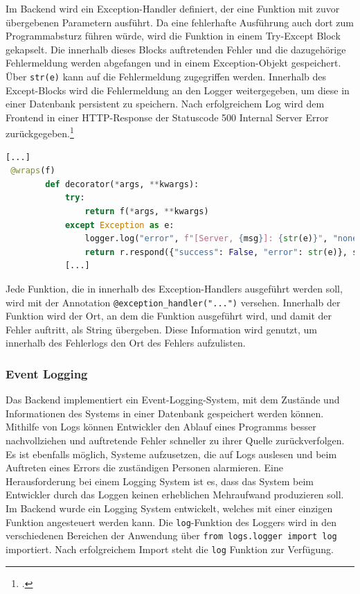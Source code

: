 Im Backend wird ein Exception-Handler definiert, der eine Funktion mit zuvor übergebenen Parametern ausführt. Da eine fehlerhafte Ausführung auch dort zum Programmabsturz führen würde, wird die Funktion in einem Try-Except Block gekapselt. Die innerhalb dieses Blocks auftretenden Fehler und die dazugehörige Fehlermeldung werden abgefangen und in einem Exception-Objekt gespeichert. Über \texttt{str(e)} kann auf die Fehlermeldung zugegriffen werden. Innerhalb des Except-Blocks wird die Fehlermeldung an den Logger weitergegeben, um diese in einer Datenbank persistent zu speichern. Nach erfolgreichem Log wird dem Frontend in einer HTTP-Response der Statuscode 500 \glqq Internal Server Error\grqq{} zurückgegeben.\footcite{fielding1999rfc2616}

\begin{lstlisting}[language=Python, caption={Exception-Handling mithilfe von Wrappern}]
[...]
 @wraps(f)
        def decorator(*args, **kwargs):
            try:
                return f(*args, **kwargs)
            except Exception as e:
                logger.log("error", f"[Server, {msg}]: {str(e)}", "none")
                return r.respond({"success": False, "error": str(e)}, status=500)
            [...]
\end{lstlisting}

Jede Funktion, die in innerhalb des Exception-Handlers ausgeführt werden soll, wird mit der Annotation \texttt{@exception\_{}handler("...")} versehen. Innerhalb der Funktion wird der Ort, an dem die Funktion ausgeführt wird, und damit der Fehler auftritt, als String übergeben. Diese Information wird genutzt, um innerhalb des Fehlerlogs den Ort des Fehlers aufzulisten.

\subsubsection{Event Logging}
Das Backend implementiert ein Event-Logging-System, mit dem Zustände und Informationen des Systems in einer Datenbank gespeichert werden können. Mithilfe von Logs können Entwickler den Ablauf eines Programms besser nachvollziehen und auftretende Fehler schneller zu ihrer Quelle zurückverfolgen. Es ist ebenfalls möglich, Systeme aufzusetzen, die auf Logs auslesen und beim Auftreten eines Errors die zuständigen Personen alarmieren. Eine Herausforderung bei einem Logging System ist es, dass das System beim Entwickler durch das Loggen keinen erheblichen Mehraufwand produzieren soll. Im Backend wurde ein Logging System entwickelt, welches mit einer einzigen Funktion angesteuert werden kann. Die \texttt{log}-Funktion des Loggers wird in den verschiedenen Bereichen der Anwendung über \texttt{from logs.logger import log} importiert. Nach erfolgreichem Import steht die \texttt{log} Funktion zur Verfügung. 

